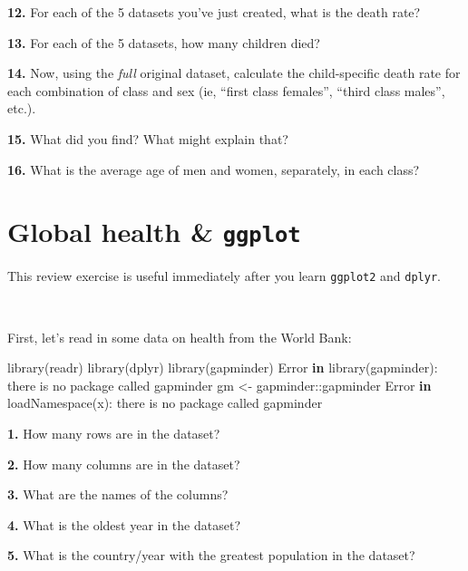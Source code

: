 \documentclass[
]{book}
\newenvironment{Shaded}{\begin{snugshade}}{\end{snugshade}}
\newcommand{\ControlFlowTok}[1]{\textcolor[rgb]{0.13,0.29,0.53}{\textbf{#1}}}
\newcommand{\FunctionTok}[1]{\textcolor[rgb]{0.00,0.00,0.00}{#1}}
\newcommand{\NormalTok}[1]{#1}
\newcommand{\OtherTok}[1]{\textcolor[rgb]{0.56,0.35,0.01}{#1}}
\newcommand{\SpecialCharTok}[1]{\textcolor[rgb]{0.00,0.00,0.00}{#1}}
\newcommand{\StringTok}[1]{\textcolor[rgb]{0.31,0.60,0.02}{#1}}
\begin{document}
\textbf{12.} For each of the 5 datasets you've just created, what is the death rate?

\textbf{13.} For each of the 5 datasets, how many children died?

\textbf{14.} Now, using the \emph{full} original dataset, calculate the child-specific death rate for each combination of class and sex (ie, ``first class females'', ``third class males'', etc.).

\textbf{15.} What did you find? What might explain that?

\textbf{16.} What is the average age of men and women, separately, in each class?

\hypertarget{global-health-ggplot}{%
\chapter{\texorpdfstring{Global health \& \texttt{ggplot}}{Global health \& ggplot}}\label{global-health-ggplot}}

This review exercise is useful immediately after you learn \texttt{ggplot2} and \texttt{dplyr}.

~

First, let's read in some data on health from the World Bank:

\begin{Shaded}
\begin{Highlighting}[]
\FunctionTok{library}\NormalTok{(readr)}
\FunctionTok{library}\NormalTok{(dplyr)}
\FunctionTok{library}\NormalTok{(gapminder)}
\NormalTok{Error }\ControlFlowTok{in} \FunctionTok{library}\NormalTok{(gapminder)}\SpecialCharTok{:}\NormalTok{ there is no package called }\StringTok{\textquotesingle{}gapminder\textquotesingle{}}
\NormalTok{gm }\OtherTok{\textless{}{-}}\NormalTok{ gapminder}\SpecialCharTok{::}\NormalTok{gapminder}
\NormalTok{Error }\ControlFlowTok{in} \FunctionTok{loadNamespace}\NormalTok{(x)}\SpecialCharTok{:}\NormalTok{ there is no package called }\StringTok{\textquotesingle{}gapminder\textquotesingle{}}
\end{Highlighting}
\end{Shaded}

\textbf{1.} How many rows are in the dataset?

\textbf{2.} How many columns are in the dataset?

\textbf{3.} What are the names of the columns?

\textbf{4.} What is the oldest year in the dataset?

\textbf{5.} What is the country/year with the greatest population in the dataset?
\end{document}

